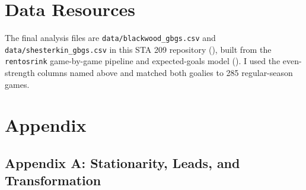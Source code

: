 \documentclass[
  10pt,
]{article}
\begin{document}
\section{Data Resources}\label{data-resources}

\small
\singlespacing

The final analysis files are \texttt{data/blackwood\_gbgs.csv} and \texttt{data/shesterkin\_gbgs.csv} in this STA 209 repository (), built from the \texttt{rentosrink} game-by-game pipeline and expected-goals model (). I used the even-strength columns named above and matched both goalies to 285 regular-season games.

\normalsize
\doublespacing

\newpage
\singlespacing

\section{Appendix}\label{appendix}

\subsection{Appendix A: Stationarity, Leads, and Transformation}\label{appendix-a-stationarity-leads-and-transformation}

\begin{table}[H]
\centering
\caption{\label{tab:stationarity-table}ADF tests for response and predictor series.}
\centering
{}
\end{table}
\end{document}

